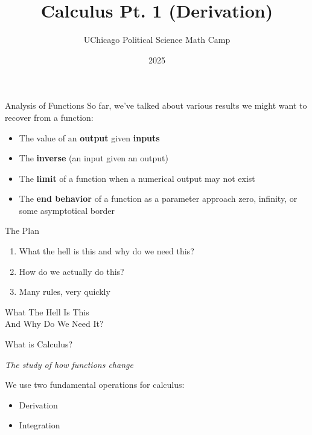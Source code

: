 \documentclass[10pt]{beamer}
\title{Calculus Pt. 1 (Derivation)}
\author{UChicago Political Science Math Camp}
\institute{Ryan Gibbons \& Luke Cain}
\date{2025}
\begin{document}
\frame{\titlepage}



\begin{frame}{Analysis of Functions}
    So far, we've talked about various results we might want to recover from a function:

    \begin{itemize}
        \item The value of an \textbf{output} given \textbf{inputs}
        \item The \textbf{inverse} (an input given an output)
        \item The \textbf{limit} of a function when a numerical output may not exist
        \item The \textbf{end behavior} of a function as a parameter approach zero, infinity, or some asymptotical border 
    \end{itemize}
\end{frame}

\begin{frame}{The Plan}
    \begin{enumerate}
        \item What the hell is this and why do we need this?
        \item How do we actually do this?
        \item Many rules, very quickly
    \end{enumerate}
\end{frame}

\begin{frame}
\thispagestyle{empty}
\vspace{1cm}
\begin{center}
\begin{Huge}
    What The Hell Is This \\
    \vspace{.5cm}
    And Why Do We Need It?
\end{Huge}
\end{center}
\end{frame}

\begin{frame}{What is Calculus?}

\textit{The study of how functions change} \\
\vspace{2cm}
\pause

We use two fundamental operations for calculus:

\begin{itemize}
    \item Derivation
    \item Integration
\end{itemize}
    
\end{frame}
\end{document}
